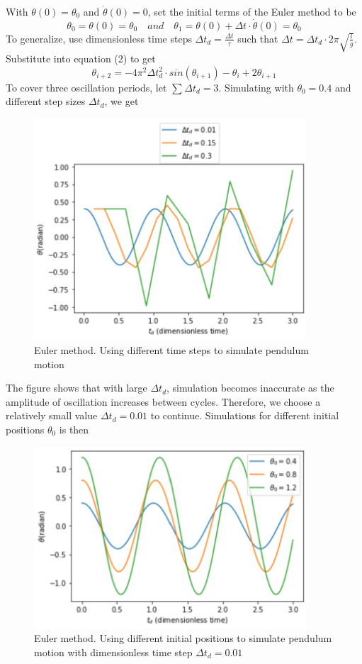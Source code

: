 \documentclass{article}
\begin{document}
With $\theta(0)=\theta_0$ and $\dot{\theta}(0)=0$, set the initial terms of the Euler method to be \[\theta_0=\theta(0)=\theta_0\quad and\quad \theta_1=\theta(0)+\Delta t\cdot\dot{\theta}(0)=\theta_0\]
To generalize, use dimensionless time steps $\Delta t_d=\frac{\Delta t}{\tau}$ such that $\Delta t=\Delta t_d \cdot 2\pi\sqrt{\frac{l}{g}}$. Substitute into equation (2) to get
\[\theta_{i+2}=-4\pi^2 \Delta t_d^2 \cdot sin(\theta_{i+1})-\theta_i+2\theta_{i+1} \tag{3}\]
To cover three oscillation periods, let $\sum{}^{}\Delta t_d=3$. 
Simulating with $\theta_0=0.4$ and different step sizes $\Delta t_d$, we get
\begin{figure}[H]
\includegraphics[width=4in]{SimpleEulerDifferentDeltaTd.jpg}
\caption{Euler method. Using different time steps to simulate pendulum motion}
\end{figure}
\noindent The figure shows that with large $\Delta t_d$, simulation becomes inaccurate as the amplitude of oscillation increases between cycles. Therefore, we choose a relatively small value $\Delta t_d=0.01$ to continue. Simulations for different initial positions $\theta_0$ is then
\begin{figure}[H]
\includegraphics[width=4in]{SimpleEulerDifferentTheta0.jpg}
\caption{Euler method. Using different initial positions to simulate pendulum motion with dimensionless time step $\Delta t_d=0.01$}
\end{figure}
\end{document}
